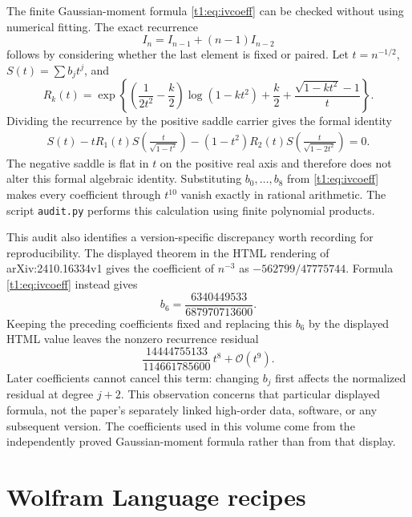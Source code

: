 \documentclass[11pt,openany]{book}
\numberwithin{equation}{chapter}
\theoremstyle{plain}
\theoremstyle{definition}
\theoremstyle{remark}
\newcommand{\OO}{\mathcal O}\newcommand{\bigO}{\mathcal O}
\begin{document}
\label{t1:app:audit}
The finite Gaussian-moment formula \eqref{t1:eq:ivcoeff} can be checked without using numerical fitting. The exact recurrence
\[
 I_n=I_{n-1}+(n-1)I_{n-2}
\]
follows by considering whether the last element is fixed or paired. Let $t=n^{-1/2}$, $S(t)=\sum b_jt^j$, and
\begin{equation}
 R_k(t)=\exp\left\{
 \left(\frac1{2t^2}-\frac k2\right)\log(1-kt^2)+\frac k2
 +\frac{\sqrt{1-kt^2}-1}{t}\right\}.
 \label{t1:eq:auditR}
\end{equation}
Dividing the recurrence by the positive saddle carrier gives the formal identity
\begin{align}
 S(t)-tR_1(t)S\!\left(\frac{t}{\sqrt{1-t^2}}\right)
 -(1-t^2)R_2(t)S\!\left(\frac{t}{\sqrt{1-2t^2}}\right)=0.
 \label{t1:eq:auditrec}
\end{align}
The negative saddle is flat in $t$ on the positive real axis and therefore does not alter this formal algebraic identity. Substituting $b_0,\ldots,b_8$ from \eqref{t1:eq:ivcoeff} makes every coefficient through $t^{10}$ vanish exactly in rational arithmetic. The script \texttt{audit.py} performs this calculation using finite polynomial products.

This audit also identifies a version-specific discrepancy worth recording for reproducibility. The displayed theorem in the HTML rendering of arXiv:2410.16334v1 \cite{ekz} gives the coefficient of $n^{-3}$ as $-562799/47775744$. Formula \eqref{t1:eq:ivcoeff} instead gives
\[
 b_6=\frac{6340449533}{687970713600}.
\]
Keeping the preceding coefficients fixed and replacing this $b_6$ by the displayed HTML value leaves the nonzero recurrence residual
\begin{equation}
 \frac{14444755133}{114661785600}\,t^8+\OO(t^9).
 \label{t1:eq:auditdiscrepancy}
\end{equation}
Later coefficients cannot cancel this term: changing $b_j$ first affects the normalized residual at degree $j+2$. This observation concerns that particular displayed formula, not the paper's separately linked high-order data, software, or any subsequent version. The coefficients used in this volume come from the independently proved Gaussian-moment formula rather than from that display.

\chapter{Wolfram Language recipes}
\label{ct:app:wolfram}
\end{document}
